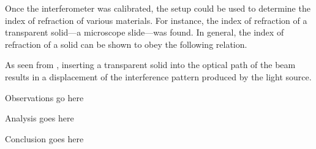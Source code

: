 \begin{paper}
	Once the interferometer was calibrated, the setup could be used to determine the index of refraction of various materials. For instance, the index of refraction of a transparent solid---a microscope slide---was found. In general, the index of refraction of a solid can be shown to obey the following relation.
	
	\begin{paperwhere}
	\end{paperwhere}
	
	As seen from \eqSolidRefractiveIndex, inserting a transparent solid into the optical path of the beam results in a displacement of the interference pattern produced by the light source. 
	
	
	Observations go here
	
	
	Analysis goes here
	

	Conclusion goes here
	

	\papersource{}

\end{paper}

